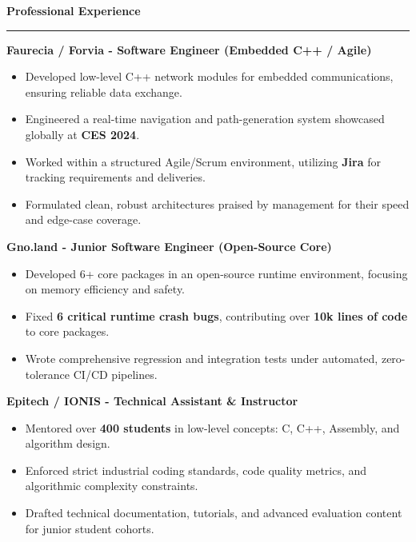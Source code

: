 \documentclass[9pt]{extarticle}
\begin{document}
\par\vspace{5pt}

{\large\bfseries Professional Experience}
\par\vspace{-8pt}
\rule{\linewidth}{0.4pt}
\par\vspace{5pt}

{\bfseries Faurecia / Forvia - Software Engineer (Embedded C++ / Agile)}
\begin{itemize}[noitemsep, topsep=0pt]
    \item Developed low-level C++ network modules for embedded communications, ensuring reliable data exchange.
    \item Engineered a real-time navigation and path-generation system showcased globally at {\bfseries CES 2024}.
    \item Worked within a structured Agile/Scrum environment, utilizing {\bfseries Jira} for tracking requirements and deliveries.
    \item Formulated clean, robust architectures praised by management for their speed and edge-case coverage.
\end{itemize}

\par\vspace{5pt}

{\bfseries Gno.land - Junior Software Engineer (Open-Source Core)}
\begin{itemize}[noitemsep, topsep=0pt]
    \item Developed 6+ core packages in an open-source runtime environment, focusing on memory efficiency and safety.
    \item Fixed {\bfseries 6 critical runtime crash bugs}, contributing over {\bfseries 10k lines of code} to core packages.
    \item Wrote comprehensive regression and integration tests under automated, zero-tolerance CI/CD pipelines.
\end{itemize}

\par\vspace{5pt}

{\bfseries Epitech / IONIS - Technical Assistant \& Instructor}
\begin{itemize}[noitemsep, topsep=0pt]
    \item Mentored over {\bfseries 400 students} in low-level concepts: C, C++, Assembly, and algorithm design.
    \item Enforced strict industrial coding standards, code quality metrics, and algorithmic complexity constraints.
    \item Drafted technical documentation, tutorials, and advanced evaluation content for junior student cohorts.
\end{itemize}
\end{document}
